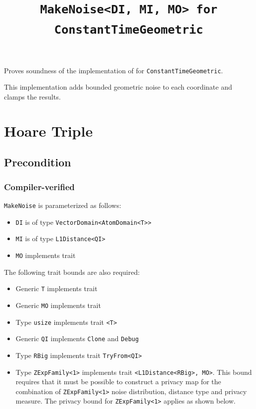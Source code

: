 \documentclass{article}
\title{\texttt{MakeNoise<DI, MI, MO> for ConstantTimeGeometric}}
\author{\MichaelShoemateAuthor}
\date{}
\begin{document}
\maketitle

\contrib
Proves soundness of the implementation of 
for \texttt{ConstantTimeGeometric}.

This implementation adds bounded geometric noise to each coordinate and clamps the results.

\section{Hoare Triple}
\subsection*{Precondition}
\subsubsection*{Compiler-verified}
\texttt{MakeNoise} is parameterized as follows:
\begin{itemize}
    \item \texttt{DI} is of type \texttt{VectorDomain<AtomDomain<T>>}
    \item \texttt{MI} is of type \texttt{L1Distance<QI>}
    \item \texttt{MO} implements trait 
\end{itemize}

The following trait bounds are also required:
\begin{itemize}
    \item Generic \texttt{T} implements trait 
    \item Generic \texttt{MO} implements trait 
    \item Type \texttt{usize} implements trait \texttt{<T>}
    \item Generic \texttt{QI} implements \texttt{Clone} and \texttt{Debug}
    \item Type \texttt{RBig} implements trait \texttt{TryFrom<QI>}
    \item Type \texttt{ZExpFamily<1>} implements trait \texttt{<L1Distance<RBig>, MO>}.
        This bound requires that it must be possible to construct a privacy map for the combination of \texttt{ZExpFamily<1>} noise distribution, distance type and privacy measure.
        The privacy bound for \texttt{ZExpFamily<1>} applies as shown below.
\end{itemize}
\end{document}
